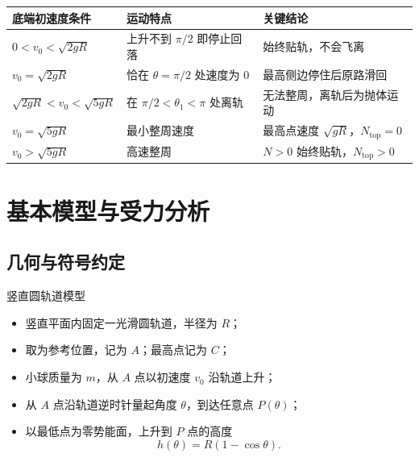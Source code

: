 \documentclass[a4paper,11pt]{ctexart}
\begin{document}
\begin{center}
\begin{minipage}{0.96\textwidth}
  \centering

  \vspace{0.5em}
  \renewcommand{\arraystretch}{1.3}
  \begin{tabular}{lll}
    \toprule
    底端初速度条件 & 运动特点 & 关键结论 \\
    \midrule
    $0 < v_0 < \sqrt{2gR}$ &
    上升不到 $\pi/2$ 即停止回落 &
    始终贴轨，不会飞离 \\
    $v_0 = \sqrt{2gR}$ &
    恰在 $\theta=\pi/2$ 处速度为 $0$ &
    最高侧边停住后原路滑回 \\
    $\sqrt{2gR} < v_0 < \sqrt{5gR}$ &
    在 $\pi/2 < \theta_1 < \pi$ 处离轨 &
    无法整周，离轨后为抛体运动 \\
    $v_0 = \sqrt{5gR}$ &
    最小整周速度 &
    最高点速度 $\sqrt{gR}$，$N_{\text{top}} = 0$ \\
    $v_0 > \sqrt{5gR}$ &
    高速整周 &
    $N>0$ 始终贴轨，$N_{\text{top}}>0$ \\
    \bottomrule
  \end{tabular}
\end{minipage}
\end{center}


\section{基本模型与受力分析}

\subsection{几何与符号约定}

\begin{definitionbox}{竖直圆轨道模型}
  \begin{itemize}
    \item 竖直平面内固定一光滑圆轨道，半径为 $R$；
    \item 取为参考位置，记为 $A$；最高点记为 $C$；
    \item 小球质量为 $m$，从 $A$ 点以初速度 $v_0$ 沿轨道上升；
    \item 从 $A$ 点沿轨道逆时针量起角度 $\theta$，到达任意点 $P(\theta)$；
    \item 以最低点为零势能面，上升到 $P$ 点的高度
          \[
            h(\theta) = R(1-\cos\theta).
          \]
  \end{itemize}
\end{definitionbox}
\end{document}
